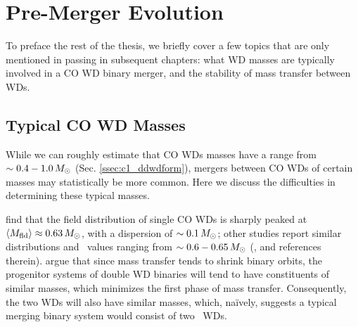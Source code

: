 \section{Pre-Merger Evolution}


To preface the rest of the thesis, we briefly cover a few topics that are only mentioned in passing in subsequent chapters: what WD masses are typically involved in a CO WD binary merger, and the stability of mass transfer between WDs.

\subsection{Typical CO WD Masses}
\label{ssec:c1_cowd_massrange}

While we can roughly estimate that CO WDs masses have a range from $\sim0.4 - 1.0\,\Msun$ (Sec. \ref{ssec:c1_ddwdform}), mergers between CO WDs of certain masses may statistically be more common.  Here we discuss the difficulties in determining these typical masses.


\cite{trem+16} find that the field distribution of single CO WDs is sharply peaked at $\Mmean \approx 0.63\,\Msun$, with a dispersion of $\sim0.1\,\Msun$; other studies report similar distributions and \Mmean\ values ranging from $\sim0.6 - 0.65\,\Msun$ (\citealt{klei+13}, and references therein).  \citeal{vkercj10} argue that since mass transfer tends to shrink binary orbits, the progenitor systems of double WD binaries will tend to have constituents of similar masses, which minimizes the first phase of mass transfer.  Consequently, the two WDs will also have similar masses, which, na\"{i}vely, suggests a typical merging binary system would consist of two \Mmean\ WDs.


